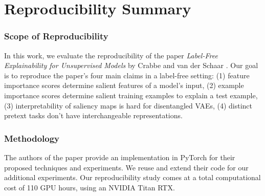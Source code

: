 \section*{\centering Reproducibility Summary}


\subsubsection*{Scope of Reproducibility}
In this work, we evaluate the reproducibility of the paper \textit{Label-Free Explainability for Unsupervised Models} by Crabbe and van der Schaar \cite{mainpaper}. Our goal is to reproduce the paper's four main claims in a label-free setting: (1) feature importance scores determine salient features of a model's input, (2) example importance scores determine salient training examples to explain a test example, (3) interpretability of saliency maps  is hard for disentangled VAEs, (4) distinct pretext tasks don’t have interchangeable representations.



\subsubsection*{Methodology}
The authors of the paper provide an implementation in PyTorch for their proposed techniques and experiments. We reuse and extend their code for our additional experiments. Our reproducibility study comes at a total computational cost of 110 GPU hours, using an NVIDIA Titan RTX. 



